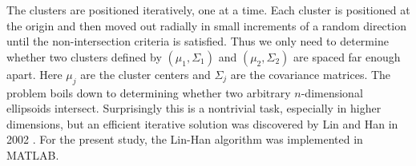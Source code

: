 \documentclass[10pt]{article}
\begin{document}
The clusters are positioned iteratively, one at a time. Each cluster is positioned at the origin and then moved out radially in small increments of a random direction until the non-intersection criteria is satisfied. Thus we only need to determine whether two clusters defined by $(\mu_1,\Sigma_1)$ and $(\mu_2,\Sigma_2)$ are spaced far enough apart. Here $\mu_j$ are the cluster centers and $\Sigma_j$ are the covariance matrices. The problem boils down to determining whether two arbitrary $n$-dimensional ellipsoids intersect. Surprisingly this is a nontrivial task, especially in higher dimensions, but an efficient iterative solution was discovered by Lin and Han in 2002 \cite{ellipsoid-distance}. For the present study, the Lin-Han algorithm was implemented in MATLAB.





\end{document}
